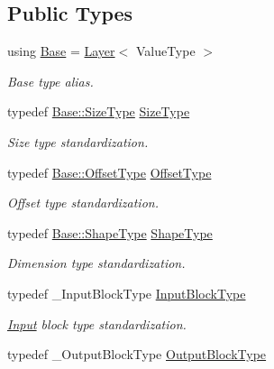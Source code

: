 \subsection*{Public Types}
\begin{DoxyCompactItemize}
\item 
using \hyperlink{classffnn_1_1layer_1_1_hidden_a2ff8a0b925b2b929b05e7889dda361e4}{Base} = \hyperlink{classffnn_1_1layer_1_1_layer}{Layer}$<$ Value\-Type $>$
\begin{DoxyCompactList}\small\item\em Base type alias. \end{DoxyCompactList}\item 
typedef \hyperlink{classffnn_1_1layer_1_1_layer_a4c4c9782d2aed41c2a5000ec5da5601a}{Base\-::\-Size\-Type} \hyperlink{classffnn_1_1layer_1_1_hidden_ac148012cb544a39841675601090cd4c8}{Size\-Type}
\begin{DoxyCompactList}\small\item\em Size type standardization. \end{DoxyCompactList}\item 
typedef \hyperlink{classffnn_1_1layer_1_1_layer_a2130560f43788898079b7c5c01fb94c8}{Base\-::\-Offset\-Type} \hyperlink{classffnn_1_1layer_1_1_hidden_ae2409b970adafb0ebc9b2eec62c4aac4}{Offset\-Type}
\begin{DoxyCompactList}\small\item\em Offset type standardization. \end{DoxyCompactList}\item 
typedef \hyperlink{classffnn_1_1layer_1_1_layer_ab80478345a2579402ae086a2f7de1ca2}{Base\-::\-Shape\-Type} \hyperlink{classffnn_1_1layer_1_1_hidden_abdfcf81b3846fae3b19a207424695df0}{Shape\-Type}
\begin{DoxyCompactList}\small\item\em Dimension type standardization. \end{DoxyCompactList}\item 
typedef \-\_\-\-Input\-Block\-Type \hyperlink{classffnn_1_1layer_1_1_hidden_ae401b1af7763caf09a0dffcaf4f2d5e9}{Input\-Block\-Type}
\begin{DoxyCompactList}\small\item\em \hyperlink{classffnn_1_1layer_1_1_input}{Input} block type standardization. \end{DoxyCompactList}\item 
typedef \-\_\-\-Output\-Block\-Type \hyperlink{classffnn_1_1layer_1_1_hidden_a9b9e276188ef490ea5301f553225c735}{Output\-Block\-Type}

\end{DoxyCompactItemize}

